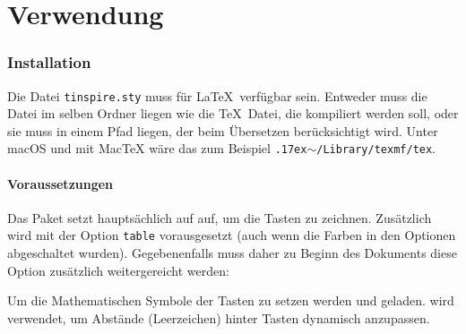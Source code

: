 \documentclass[a4paper,add-index]{cnltx-doc}
\newcommand{\home}{{\raise.17ex\hbox{$\scriptstyle\mathtt{\sim}$}}}
\begin{document}
\clearpage
\begin{center}\Huge \TIN\end{center}
\part{Verwendung}

\section{Installation}
Die Datei \texttt{tinspire.sty} muss für \LaTeX\ verfügbar sein. Entweder muss die Datei im selben Ordner liegen wie die \TeX\ Datei, die kompiliert werden soll, oder sie muss in einem Pfad liegen, der beim Übersetzen berücksichtigt wird. Unter macOS und mit MacTeX wäre das zum Beispiel \texttt{\home/Library/texmf/tex}.

\subsection{Voraussetzungen}
Das Paket setzt hauptsächlich auf  auf, um die Tasten zu zeichnen. Zusätzlich wird  mit der Option \texttt{table} vorausgesetzt (auch wenn die Farben in den Optionen abgeschaltet wurden). Gegebenenfalls muss daher zu Beginn des Dokuments diese Option zusätzlich weitergereicht werden: 

Um die Mathematischen Symbole der Tasten zu setzen werden  und  geladen.  wird verwendet, um Abstände (Leerzeichen) hinter Tasten dynamisch anzupassen.
\end{document}
